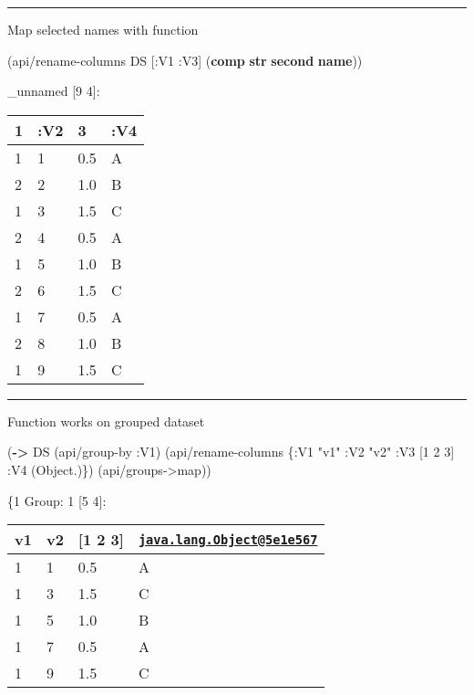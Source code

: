 \documentclass[]{article}
\newenvironment{Shaded}{\begin{snugshade}}{\end{snugshade}}
\newcommand{\AttributeTok}[1]{\textcolor[rgb]{0.77,0.63,0.00}{#1}}
\newcommand{\DecValTok}[1]{\textcolor[rgb]{0.00,0.00,0.81}{#1}}
\newcommand{\KeywordTok}[1]{\textcolor[rgb]{0.13,0.29,0.53}{\textbf{#1}}}
\newcommand{\NormalTok}[1]{#1}
\newcommand{\StringTok}[1]{\textcolor[rgb]{0.31,0.60,0.02}{#1}}
\begin{document}
\begin{center}\rule{0.5\linewidth}{0.5pt}\end{center}

Map selected names with function

\begin{Shaded}
\begin{Highlighting}[]
\NormalTok{(api/rename-columns DS [}\AttributeTok{:V1} \AttributeTok{:V3}\NormalTok{] (}\KeywordTok{comp} \KeywordTok{str} \KeywordTok{second} \KeywordTok{name}\NormalTok{))}
\end{Highlighting}
\end{Shaded}

\_unnamed {[}9 4{]}:

\begin{longtable}[]{@{}llll@{}}
\toprule
1 & :V2 & 3 & :V4\tabularnewline
\midrule
\endhead
1 & 1 & 0.5 & A\tabularnewline
2 & 2 & 1.0 & B\tabularnewline
1 & 3 & 1.5 & C\tabularnewline
2 & 4 & 0.5 & A\tabularnewline
1 & 5 & 1.0 & B\tabularnewline
2 & 6 & 1.5 & C\tabularnewline
1 & 7 & 0.5 & A\tabularnewline
2 & 8 & 1.0 & B\tabularnewline
1 & 9 & 1.5 & C\tabularnewline
\bottomrule
\end{longtable}

\begin{center}\rule{0.5\linewidth}{0.5pt}\end{center}

Function works on grouped dataset

\begin{Shaded}
\begin{Highlighting}[]
\NormalTok{(}\KeywordTok{->}\NormalTok{ DS}
\NormalTok{    (api/group-by }\AttributeTok{:V1}\NormalTok{)}
\NormalTok{    (api/rename-columns \{}\AttributeTok{:V1} \StringTok{"v1"}
                         \AttributeTok{:V2} \StringTok{"v2"}
                         \AttributeTok{:V3}\NormalTok{ [}\DecValTok{1} \DecValTok{2} \DecValTok{3}\NormalTok{]}
                         \AttributeTok{:V4}\NormalTok{ (Object.)\})}
\NormalTok{    (api/groups->map))}
\end{Highlighting}
\end{Shaded}

\{1 Group: 1 {[}5 4{]}:

\begin{longtable}[]{@{}llll@{}}
\toprule
v1 & v2 & {[}1 2 3{]} &
\href{mailto:java.lang.Object@5e1e567}{\nolinkurl{java.lang.Object@5e1e567}}\tabularnewline
\midrule
\endhead
1 & 1 & 0.5 & A\tabularnewline
1 & 3 & 1.5 & C\tabularnewline
1 & 5 & 1.0 & B\tabularnewline
1 & 7 & 0.5 & A\tabularnewline
1 & 9 & 1.5 & C\tabularnewline
\bottomrule
\end{longtable}
\end{document}
